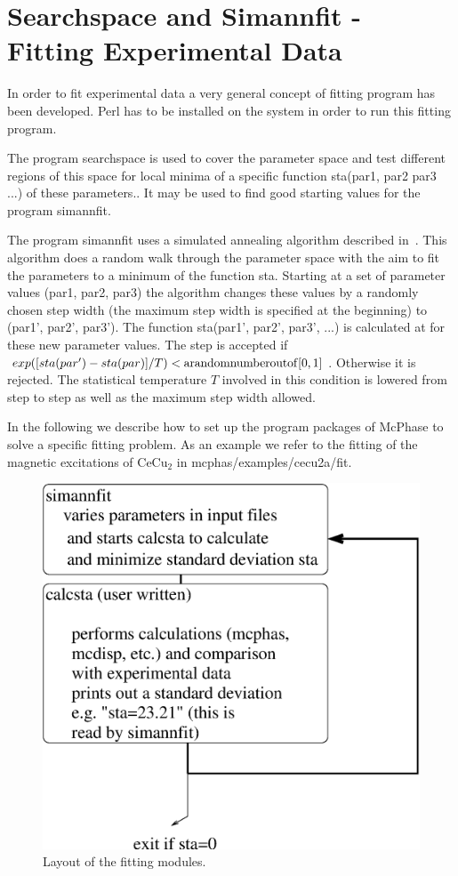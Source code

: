 \section{{\prg Searchspace and Simannfit} - Fitting Experimental Data}\label{simannfit}

In order to fit experimental data a very general concept of fitting program 
has been developed. 
{\prg Perl} has to be installed on the system in order to run
this fitting program.

The program {\prg searchspace} is used to cover the parameter space and test
different regions of this space for local minima 
of a specific function {\prg sta(par1, par2 par3 ...)} of
these parameters.. It may be used to 
find good starting values for the program {\prg simannfit}.

The program {\prg simannfit} uses a simulated annealing algorithm described
in~\cite{kirkpatrick83-671}.
This algorithm does a random walk through the parameter space 
with the aim to fit the parameters to  a minimum of the function {\prg sta}.
  Starting at a set of parameter values (par1, par2, par3) the algorithm
changes these values by a randomly chosen step width (the maximum step width
is specified at the beginning) to (par1', par2', par3').
 The function {\prg sta(par1', par2', par3', ...)} is calculated at
for these new parameter values. The step is accepted if 
$exp([sta(par')-sta(par)]/T)<{\rm a random number out of} [0,1]$.
Otherwise it is rejected. The statistical temperature $T$ involved in this
condition is lowered from step to step as well as the maximum step width allowed.

In the following we describe how to set up the program packages of {\prg McPhase} to
solve a specific fitting problem.
As an example we refer to the fitting of the magnetic 
excitations of CeCu$_2$ in {\prg mcphas/examples/cecu2a/fit}. 

\begin{figure}[hb]\label{safit}
\includegraphics[angle=0,width=0.7\columnwidth]{./figsrc/simannfit.eps}
\caption{Layout of the fitting modules.}
\end{figure}



